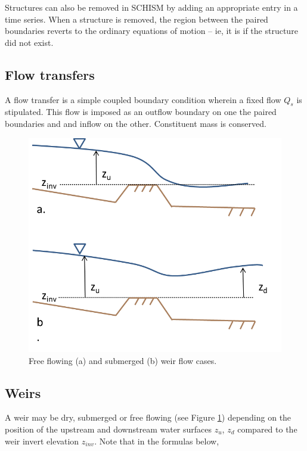 Structures can also be removed in SCHISM by adding 
an appropriate entry in a time series. When a structure is removed, the region between the paired boundaries reverts to the ordinary equations of motion -- ie, it is if the structure did not exist.

\subsection{Flow transfers}
\label{sec-transfer}
A flow transfer is a simple coupled boundary condition wherein a fixed flow $Q_s$ is stipulated. This flow
is imposed as an outflow boundary on one the paired boundaries and and inflow on the other. Constituent mass 
is conserved.

\begin{figure}
	\centering
		\includegraphics[scale=1]{image/weir}
	\caption{Free flowing (a) and submerged (b) weir flow cases.}
	\label{fig:weir}
\end{figure}

\subsection{Weirs}
A weir may be dry, submerged or free flowing (see Figure \ref{fig:weir}) depending on the position of the upstream
and downstream water surfaces $z_{u}$, $z_{d}$ compared to the weir invert elevation $z_{inv}$. Note that in the formulas
below, 

